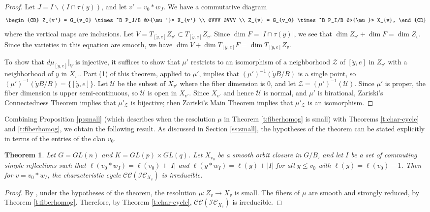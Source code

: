 \documentclass[11pt,letterpaper,reqno]{amsart}
\newcommand{\cC}{\mathcal C}
\newcommand{\cI}{\mathcal I}
\newcommand{\IC}{\cI \cC}
\newcommand{\CC}{\cC \cC}
\numberwithin{equation}{section}
\theoremstyle{plain}
\newtheorem{theorem}{Theorem}[section]
\theoremstyle{definition}
\theoremstyle{remark}
\newcommand{\U}{\mathcal{U}}
\begin{document}
\begin{proof}
Let $J = I \smallsetminus (I \cap \tau(y))$, and let $v' = v_0*w_J$.  We have a commutative diagram
$$
\begin{CD}
Z_{v'} = G_{v_0} \times^B P_J/B @>{\mu'}>> X_{v'} \\
@VVV @VVV \\
Z_{v} = G_{v_0} \times^B P_I/B @>{\mu}>> X_{v},
\end{CD}
$$
where the vertical maps are inclusions.  Let $V = T_{[\dot{y},e]} Z_{v'} \subset T_{[\dot{y},e]} Z_{v}$.
Since $\dim F = | I \cap \tau(y) |$, we see that $\dim Z_{v'} + \dim F = \dim Z_v$.  Since the varieties
in this equation are smooth, we have $\dim V + \dim T_{[\dot{y},e]} F = \dim T_{[\dot{y},e]} Z_v$. 

To show that $d\mu_{[\dot{y},e]}|_V$ is injective, it suffices to show that $\mu'$ restricts to an isomorphism of
a neighborhood $\mathcal Z$ of $[\dot{y},e]$ in $Z_{v'}$ with a neighborhood of $y$ in $X_{v'}$.  Part (1) of this theorem, applied
to $\mu'$, implies that $(\mu')^{-1}(\dot{y}B/B)$ is a single point, so $(\mu')^{-1}(\dot{y}B/B) = \{ [\dot{y},e] \}$.  Let $\U$ be the subset
of $X_{v'}$ where the fiber dimension is $0$, and let ${\mathcal Z} = (\mu')^{-1}(\U)$.
Since $\mu'$ is proper,
the fiber dimension is upper semi-continuous, so $\U$ is open in $X_{v'}$.
Since $X_{v'}$ and hence $\U$ is normal, and $\mu'$ is birational, Zariski's Connectedness Theorem implies that $\mu'_{\mathcal Z}$ is bijective;
then Zariski's Main Theorem implies that $\mu'_{\mathcal Z}$ is an isomorphism.
\end{proof}

Combining Proposition \ref{p:small} (which describes when the resolution $\mu$ in Theorem \ref{t:fiberhomog} is small)
 with Theorems \ref{t:char-cycle} and \ref{t:fiberhomog},
we obtain the following result.  As discussed in Section \ref{ss:small}, the hypotheses of the theorem can be stated explicitly
in terms of the entries of the clan $v_0$.

\begin{theorem} \label{t:irreducible}
Let $G = GL(n)$ and $K = GL(p) \times GL(q)$.  Let $X_{v_0}$ be a smooth orbit closure in $G/B$, and let $I$ be a set of commuting simple reflections such that 
$\ell(v_0* w_I) = \ell(v_0)+ |I|$ and $\ell(y* w_I) = \ell(y) + |I|$ for all $y \leq v_0$ with $\ell(y) = \ell(v_0) - 1$.  Then for $v=v_0*w_I$, the characteristic
cycle $\CC(\IC_{X_v})$ is irreducible.
\end{theorem}

\begin{proof}
By \cite[Prop.~5.3.2]{Lar}, under the hypotheses of the theorem, the resolution $\mu: Z_v \to X_v$ is small. The fibers of $\mu$ are smooth and
strongly reduced, by Theorem \ref{t:fiberhomog}. Therefore, by Theorem \ref{t:char-cycle}, $\CC(\IC_{X_v})$ is irreducible.
\end{proof}
\end{document}
